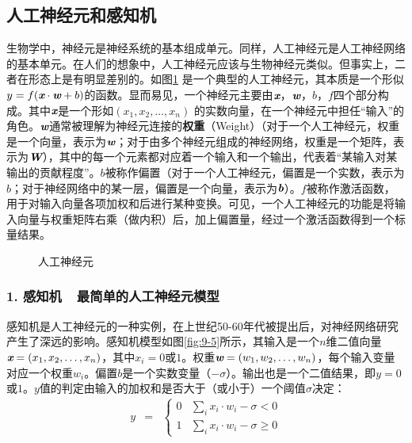 \subsection{人工神经元和感知机}

\parinterval 生物学中，神经元是神经系统的基本组成单元。同样，人工神经元是人工神经网络的基本单元。在人们的想象中，人工神经元应该与生物神经元类似。但事实上，二者在形态上是有明显差别的。如图\ref{fig:9-4} 是一个典型的人工神经元，其本质是一个形似$ y=f({\textbf{\em x}}\cdot {\textbf{\em w}}+b) $的函数。显而易见，一个神经元主要由$ {\textbf{\em x}} $，$ {\textbf{\em w}} $，$ b $，$ f $四个部分构成。其中$ {\textbf{\em x}} $是一个形如$ (x_1,x_2,\dots,x_n) $ 的实数向量，在一个神经元中担任“输入”的角色。$ {\textbf{\em w}} $通常被理解为神经元连接的{\small\sffamily\bfseries{权重}}（Weight）（对于一个人工神经元，权重是一个向量，表示为$ {\textbf{\em w}} $；对于由多个神经元组成的神经网络，权重是一个矩阵，表示为$ {\textbf{\em W}} $），其中的每一个元素都对应着一个输入和一个输出，代表着“某输入对某输出的贡献程度”。$ b $被称作偏置（对于一个人工神经元，偏置是一个实数，表示为$b$；对于神经网络中的某一层，偏置是一个向量，表示为${\textbf{\em b}}$）。$ f $被称作激活函数，用于对输入向量各项加权和后进行某种变换。可见，一个人工神经元的功能是将输入向量与权重矩阵右乘（做内积）后，加上偏置量，经过一个激活函数得到一个标量结果。

\begin{figure}[htp]
\centering

\caption{人工神经元}
\label{fig:9-4}
\end{figure}


\vspace{-0.5em}
\subsubsection{1. 感知机\ \dash \ 最简单的人工神经元模型}

\vspace{0.5em}
\parinterval 感知机是人工神经元的一种实例，在上世纪50-60年代被提出后，对神经网络研究产生了深远的影响。感知机模型如图\ref {fig:9-5}所示，其输入是一个$n$维二值向量$ {\textbf{\em x}}=(x_1,x_2,\dots,x_n) $，其中$ x_i=0 $或$ 1 $。权重${\textbf{\em w}}=(w_1,w_2,\dots,w_n) $，每个输入变量对应一个权重$ w_i $。偏置$ b $是一个实数变量（$ -\sigma $）。输出也是一个二值结果，即$ y=0 $或$ 1 $。$ y $值的判定由输入的加权和是否大于（或小于）一个阈值$ \sigma $决定：
\begin{eqnarray}
y&=&\begin{cases} 0 & \sum_{i}{x_i\cdot w_i}-\sigma <0\\1 & \sum_{i}{x_i\cdot w_i}-\sigma \geqslant 0\end{cases}
\label{eq:9-19}
\end{eqnarray}

